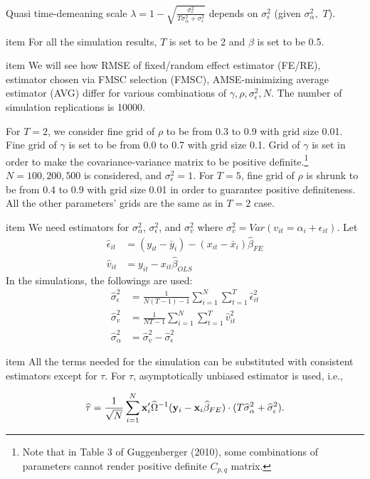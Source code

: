 Quasi time-demeaning scale $\lambda = 1- \sqrt{\frac{\sigma_\epsilon^2}{T\sigma_\alpha^2 + \sigma_\epsilon^2}}$ depends on $\sigma_\epsilon^2$ (given $\sigma_\alpha^2, \,\, T$).

item For all the simulation results, $T$ is set to be 2 and $\beta$ is set to be 0.5.

item We will see how RMSE of fixed/random effect estimator (FE/RE), estimator chosen via FMSC selection (FMSC), AMSE-minimizing average estimator (AVG) differ for various combinations of $\gamma, \rho , \sigma_\epsilon^2, N$. The number of simulation replications is 10000.

For $T=2$, we consider fine grid of $\rho$ to be from 0.3 to 0.9 with grid size 0.01. Fine grid of $\gamma$ is set to be from 0.0 to 0.7 with grid size 0.1. Grid of $\gamma$ is set in order to make the covariance-variance matrix to be positive definite.\footnote{Note that in Table 3 of Guggenberger (2010), some combinations of parameters cannot render positive definite $C_{p,q}$ matrix.} $N = 100, 200, 500$ is considered, and $\sigma_\epsilon^2 = 1$. For $T=5$, fine grid of $\rho$ is shrunk to be from 0.4 to 0.9 with grid size 0.01 in order to guarantee positive definiteness. All the other parameters' grids are the same as in $T=2$ case.

item We need estimators for $\sigma_\alpha^2$, $\sigma_\epsilon^2$, and $\sigma_v^2$ where $\sigma_v^2 = Var(v_{it} = \alpha_i + \epsilon_{it})$. Let 
\begin{align*}
\widehat{\epsilon}_{it}& = (y_{it} -\bar{y}_i) - (x_{it} - \bar{x}_i) \widehat{\beta}_{FE}\\
\widehat{v}_{it} &= y_{it} - x_{it} \widehat{\beta}_{OLS}
\end{align*} 
In the simulations, the followings are used: 
\begin{align*}
\widehat{\sigma}_\epsilon^2 &= \frac{1}{N(T-1)-1} \sum_{i=1}^N \sum_{t=1}^T \widehat{\epsilon}_{it}^2\\
\widehat{\sigma}_v^2 &= \frac{1}{NT-1} \sum_{i=1}^N \sum_{t=1}^T \widehat{v}_{it}^2\\
\widehat{\sigma}_\alpha^2 &= \widehat{\sigma}_v^2 - \widehat{\sigma}_\epsilon^2
\end{align*}

item All the terms needed for the simulation can be substituted with consistent estimators except for $\tau$. For $\tau$, asymptotically unbiased estimator is used, i.e., 

\[
\widehat{\tau} = \frac{1}{\sqrt{N}} \sum_{i=1}^N \mathbf{x}_i' \widehat{\Omega}^{-1} (\mathbf{y}_i - \mathbf{x}_i\widehat{\beta}_{FE}) \cdot (T\widehat{\sigma}_\alpha^2+\widehat{\sigma}_\epsilon^2).\\
\]

